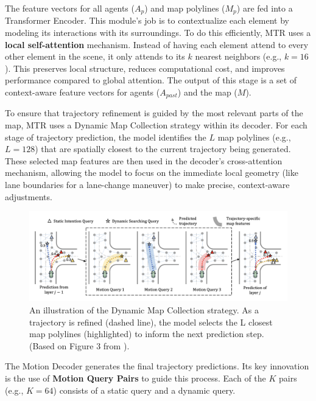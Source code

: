The feature vectors for all agents ($A_p$) and map polylines ($M_p$) are fed into a Transformer Encoder. This module's job is to contextualize each element by modeling its interactions with its surroundings. To do this efficiently, MTR uses a \textbf{local self-attention} mechanism. Instead of having each element attend to every other element in the scene, it only attends to its $k$ nearest neighbors (e.g., $k=16$). This preserves local structure, reduces computational cost, and improves performance compared to global attention. The output of this stage is a set of context-aware feature vectors for agents ($A_{past}$) and the map ($M$).

\label{subsec:dynamic_map_collection_strategy}
To ensure that trajectory refinement is guided by the most relevant parts of the map, MTR uses a Dynamic Map Collection strategy within its decoder. For each stage of trajectory prediction, the model identifies the $L$ map polylines (e.g., $L=128$) that are spatially closest to the current trajectory being generated. These selected map features are then used in the decoder's cross-attention mechanism, allowing the model to focus on the immediate local geometry (like lane boundaries for a lane-change maneuver) to make precise, context-aware adjustments.

\begin{figure}[htbp]
    \centering
    \includegraphics[width=\textwidth]{figures/dynamic_map.png}
    \caption{An illustration of the Dynamic Map Collection strategy. As a trajectory is refined (dashed line), the model selects the L closest map polylines (highlighted) to inform the next prediction step. (Based on Figure 3 from \cite{Shi2022MTR}).}
    \label{fig:dynamic_map}
\end{figure}

The Motion Decoder generates the final trajectory predictions. Its key innovation is the use of \textbf{Motion Query Pairs} to guide this process. Each of the $K$ pairs (e.g., $K=64$) consists of a static query and a dynamic query.

